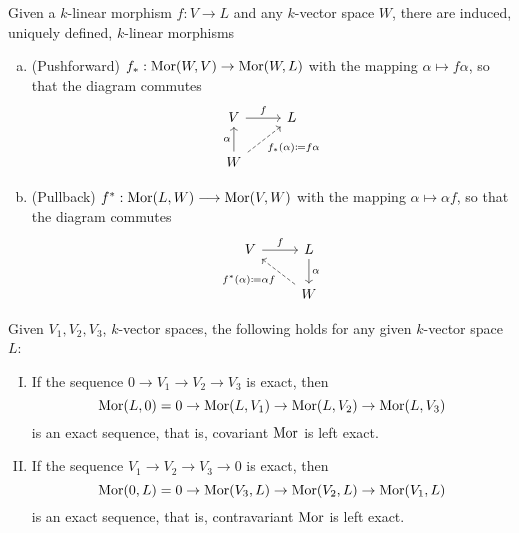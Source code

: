 \begin{definition}
Given a \(k\)-linear morphism \(f : V \to L\) and any \(k\)-vector space
\(W\), there are induced, uniquely defined, \(k\)-linear morphisms
\begin{enumerate}[(a)]
  \item (Pushforward) \(f_\ast : \operatorname{Mor}(W, V) \to \operatorname{Mor}(W, L)\) with the mapping
    \(\alpha \mapsto f  \alpha\), so that the diagram commutes
    \[
      \begin{tikzcd}
        V \ar[r, "f"]
          &L \\
        W \ar[u, "\alpha"]
        \ar[ur, dashed, swap, "f_\ast(\alpha) \coloneq f  \alpha"]
      \end{tikzcd}
    \]
  \item (Pullback) \(f^\ast : \operatorname{Mor}(L, W) \longrightarrow \operatorname{Mor}(V, W)\) with
    the mapping \(\alpha \longmapsto \alpha  f\), so that the diagram
    commutes
    \[
      \begin{tikzcd}
        V \ar[r, "f"]
          &L \ar[d, "\alpha"] \\
          &W \ar[ul, dashed, "f^\ast(\alpha) \coloneq \alpha  f"]
      \end{tikzcd}
    \]
\end{enumerate}
\end{definition}

\begin{proposition}
Given \(V_1, V_2, V_3\), \(k\)-vector spaces, the following holds for any
given \(k\)-vector space \(L\):
\begin{enumerate}[I.]
  \item If the sequence \(0 \to V_1 \to V_2 \to V_3\) is exact, then
    \[
        \operatorname{Mor}(L, 0) = 0 \to \operatorname{Mor}(L, V_1) \to \operatorname{Mor}(L, V_2) \to \operatorname{Mor}(L, V_3)
    \]
    is an exact sequence, that is, covariant \(\operatorname{Mor}\) is left exact.
  \item If the sequence \(V_1 \to V_2 \to V_3 \to 0\) is exact, then
    \[
        \operatorname{Mor}(0, L) = 0 \to \operatorname{Mor}(V_3, L) \to \operatorname{Mor}(V_2, L) \to \operatorname{Mor}(V_1, L)
    \]
    is an exact sequence, that is, contravariant \(\operatorname{Mor}\) is left exact.
\end{enumerate}
\end{proposition}


